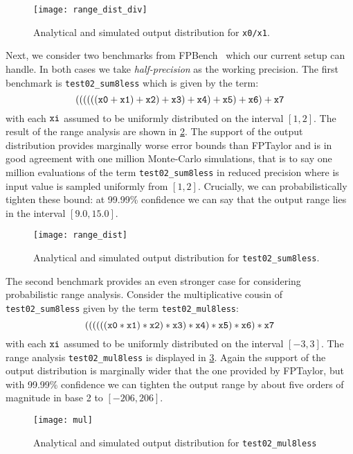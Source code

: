 \documentclass[10pt,conference]{IEEEtran}
\begin{document}
\begin{figure}[h!]
\texttt{[image: range\_dist\_div]}
\caption{Analytical and simulated output distribution for \texttt{x0/x1}.}
\label{fig:impl:div}
\end{figure}

Next, we consider two benchmarks from FPBench~\cite{fpbench} which our current setup can handle. In both cases we take \emph{half-precision} as the working precision. The first benchmark is \texttt{test02\_sum8less} which is given by the term: 
\[
\tt{((((((x0 + x1) + x2) + x3) + x4) + x5) + x6) + x7}
\]
with each $\tt xi$ assumed to be uniformly distributed on the interval $\left[1,2\right]$. The result of the range analysis are shown in \cref{fig:impl:benchmark}. The support of the output distribution provides marginally worse error bounds than FPTaylor and is in good agreement with one million Monte-Carlo simulations, that is to say one million evaluations of the term \texttt{test02\_sum8less} in reduced precision where is input value is sampled uniformly from $\left[1,2\right]$. Crucially, we can probabilistically tighten these bound: at 99.99\% confidence we can say that the output range lies in the interval $\left [9.0,15.0\right]$.

\begin{figure}[h!]
	\texttt{[image: range\_dist]}
	\caption{Analytical and simulated output distribution for \texttt{test02\_sum8less}.}
	\label{fig:impl:benchmark}
\end{figure}

The second benchmark provides an even stronger case for considering probabilistic range analysis. Consider the multiplicative cousin of \texttt{test02\_sum8less} given by the term \texttt{test02\_mul8less}:
\[
\tt{((((((x0 * x1) * x2) * x3) * x4) * x5) * x6) * x7}
\]
with each $\tt xi$ assumed to be uniformly distributed on the interval $\left[-3,3\right]$. The range analysis \texttt{test02\_mul8less} is displayed in \cref{fig:impl:benchmark2}. Again the support of the output distribution is marginally wider that the one provided by FPTaylor, but with 99.99\% confidence we can tighten the output range by about five orders of magnitude in base 2 to $\left[-206,206\right]$.
\begin{figure}[h!]
	\texttt{[image: mul]}
	\caption{Analytical and simulated output distribution for \texttt{test02\_mul8less}}
	\label{fig:impl:benchmark2}
\end{figure}
\end{document}
